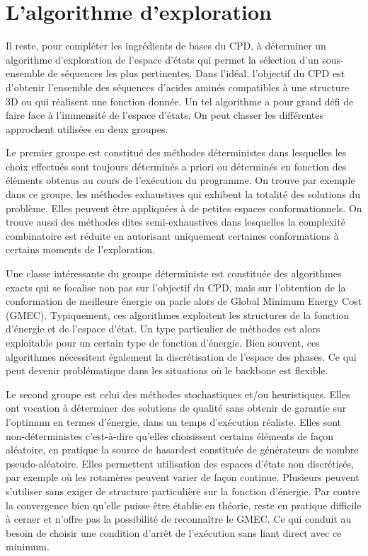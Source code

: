 \section{L'algorithme d'exploration}

Il reste, pour compléter les ingrédients de bases du CPD, à déterminer un algorithme d'exploration de l'espace d'états qui permet la sélection d'un sous-ensemble de séquences les plus pertinentes. Dans l'idéal, l'objectif du CPD est d'obtenir l'ensemble des séquences d'acides aminés compatibles à une structure 3D ou qui réalisent une fonction donnée. Un tel algorithme a pour grand défi de faire face à l'immensité de l'espace d'états. On peut classer les différentes approchent utilisées en deux groupes.

Le premier groupe est constitué des méthodes déterministes dans lesquelles les choix effectués sont toujours déterminés a priori ou déterminés en fonction des éléments obtenus au cours de l'exécution du programme. On trouve par exemple dans ce groupe, les méthodes exhaustives qui exhibent la totalité des solutions du problème. Elles peuvent être appliquées à de petites espaces conformationnels. On trouve aussi des méthodes dites semi-exhaustives dans lesquelles la complexité combinatoire est réduite en autorisant uniquement certaines conformations à certains moments de l'exploration.

Une classe intéressante du groupe déterministe est constituée des algorithmes exacts qui se focalise non pas sur l'objectif du CPD, mais sur l'obtention de la conformation de meilleure énergie on parle alors de \og Global Minimum Energy Cost \fg (GMEC).
Typiquement, ces algorithmes exploitent les structures de la fonction d'énergie et de l'espace d'état. Un type particulier de méthodes est alors exploitable pour un certain type de fonction d'énergie. Bien souvent, ces algorithmes nécessitent également la discrétisation de l'espace des phases. Ce qui peut devenir problématique dans les situations où le backbone est flexible.
  
Le second groupe est celui des méthodes stochastiques et/ou heuristiques. Elles ont vocation à déterminer des solutions de qualité sans obtenir de garantie sur l'optimum en termes d'énergie, dans un temps d'exécution réaliste. Elles sont non-déterministes c'est-à-dire qu'elles choisissent certains éléments de façon aléatoire, en pratique la \og source de hasard\fg est constituée de générateurs de nombre pseudo-aléatoire. Elles permettent utilisation des espaces d'états non discrétisés, par exemple \cite{Perry12} où les rotamères peuvent varier de façon continue. Plusieurs peuvent s'utiliser sans exiger de structure particulière sur la fonction d'énergie. Par contre la convergence bien qu'elle puisse être établie en théorie, reste en pratique difficile à cerner et n'offre pas la possibilité de reconnaître le GMEC. Ce qui conduit au besoin de choisir une condition d'arrêt de l'exécution sans liant direct avec ce minimum.  

